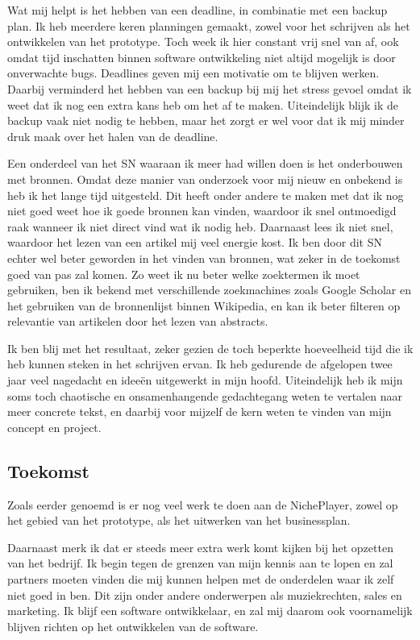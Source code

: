 Wat mij helpt is het hebben van een deadline, in combinatie met een backup plan. Ik heb meerdere keren planningen gemaakt, zowel voor het schrijven als het ontwikkelen van het prototype. Toch week ik hier constant vrij snel van af, ook omdat tijd inschatten binnen software ontwikkeling niet altijd mogelijk is door onverwachte bugs. Deadlines geven mij een motivatie om te blijven werken. Daarbij verminderd het hebben van een backup bij mij het stress gevoel omdat ik weet dat ik nog een extra kans heb om het af te maken. Uiteindelijk blijk ik de backup vaak niet nodig te hebben, maar het zorgt er wel voor dat ik mij minder druk maak over het halen van de deadline.

Een onderdeel van het SN waaraan ik meer had willen doen is het onderbouwen met bronnen. Omdat deze manier van onderzoek voor mij nieuw en onbekend is heb ik het lange tijd uitgesteld. Dit heeft onder andere te maken met dat ik nog niet goed weet hoe ik goede bronnen kan vinden, waardoor ik snel ontmoedigd raak wanneer ik niet direct vind wat ik nodig heb. Daarnaast lees ik niet snel, waardoor het lezen van een artikel mij veel energie kost. Ik ben door dit SN echter wel beter geworden in het vinden van bronnen, wat zeker in de toekomst goed van pas zal komen. Zo weet ik nu beter welke zoektermen ik moet gebruiken, ben ik bekend met verschillende zoekmachines zoals Google Scholar en het gebruiken van de bronnenlijst binnen Wikipedia, en kan ik beter filteren op relevantie van artikelen door het lezen van abstracts.

Ik ben blij met het resultaat, zeker gezien de toch beperkte hoeveelheid tijd die ik heb kunnen steken in het schrijven ervan. Ik heb gedurende de afgelopen twee jaar veel nagedacht en ideeën uitgewerkt in mijn hoofd. Uiteindelijk heb ik mijn soms toch chaotische en onsamenhangende gedachtegang weten te vertalen naar meer concrete tekst, en daarbij voor mijzelf de kern weten te vinden van mijn concept en project.

\subsection{Toekomst}
Zoals eerder genoemd is er nog veel werk te doen aan de NichePlayer, zowel op het gebied van het prototype, als het uitwerken van het businessplan.

Daarnaast merk ik dat er steeds meer extra werk komt kijken bij het opzetten van het bedrijf. Ik begin tegen de grenzen van mijn kennis aan te lopen en zal partners moeten vinden die mij kunnen helpen met de onderdelen waar ik zelf niet goed in ben. Dit zijn onder andere onderwerpen als muziekrechten, sales en marketing. Ik blijf een software ontwikkelaar, en zal mij daarom ook voornamelijk blijven richten op het ontwikkelen van de software.


